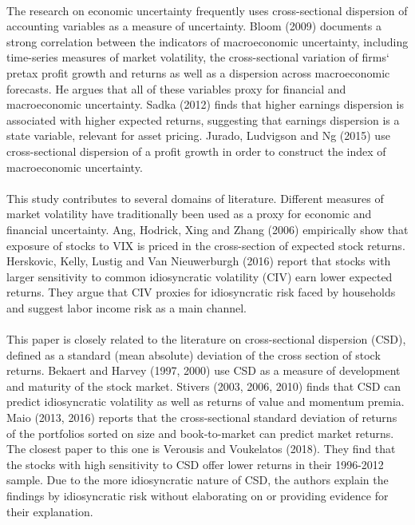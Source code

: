 \documentclass[12pt]{article}
\begin{document}
\paragraph{}
The research on economic uncertainty frequently uses cross-sectional dispersion of accounting variables as a measure of uncertainty. Bloom (2009) documents a strong correlation between the indicators of macroeconomic uncertainty, including time-series measures of market volatility, the cross-sectional variation of firms` pretax profit growth and returns as well as a dispersion across macroeconomic forecasts. He argues that all of these variables proxy for financial and macroeconomic uncertainty. Sadka (2012) finds that higher earnings dispersion is associated with higher expected returns, suggesting that earnings dispersion is a state variable, relevant for asset pricing. Jurado, Ludvigson and Ng (2015) use cross-sectional dispersion of a profit growth in order to construct the index of macroeconomic uncertainty.
\paragraph{}
This study contributes to several domains of literature. Different measures of market volatility have traditionally been used as a proxy for economic and financial uncertainty. Ang, Hodrick, Xing and Zhang (2006) empirically show that exposure of stocks to VIX is priced in the cross-section of expected stock returns. Herskovic, Kelly, Lustig and Van Nieuwerburgh (2016) report that stocks with larger sensitivity to common idiosyncratic volatility (CIV) earn lower expected returns. They argue that CIV proxies for idiosyncratic risk faced by households and suggest labor income risk as a main channel.
\paragraph{}
This paper is closely related to the literature on cross-sectional dispersion (CSD), defined as a standard (mean absolute) deviation of the cross section of stock returns. Bekaert and Harvey (1997, 2000) use CSD as a measure of development and maturity of the stock market. Stivers (2003, 2006, 2010) finds that CSD can predict idiosyncratic volatility as well as returns of value and momentum premia. Maio (2013, 2016) reports that the cross-sectional standard deviation of returns of the portfolios sorted on size and book-to-market can predict market returns. The closest paper to this one is Verousis and Voukelatos (2018). They find that the stocks with high sensitivity to CSD offer lower returns in their 1996-2012 sample. Due to the more idiosyncratic nature of CSD, the authors explain the findings by idiosyncratic risk without elaborating on or providing evidence for their explanation.
\end{document}
